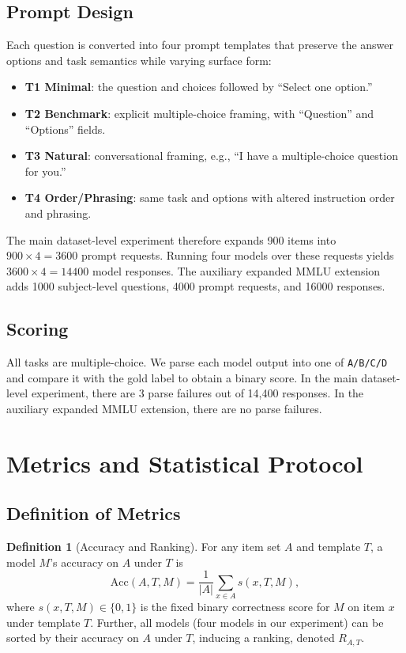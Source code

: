 \documentclass[11pt]{article}
\theoremstyle{definition}
\newtheorem{definition}{Definition}
\begin{document}
\subsection{Prompt Design}

Each question is converted into four prompt templates that preserve the answer options and task semantics while varying surface form:
\begin{itemize}[label={}]
    \item \textbf{T1 Minimal}: the question and choices followed by ``Select one option.''
    \item \textbf{T2 Benchmark}: explicit multiple-choice framing, with ``Question'' and ``Options'' fields.
    \item \textbf{T3 Natural}: conversational framing, e.g., ``I have a multiple-choice question for you.''
    \item \textbf{T4 Order/Phrasing}: same task and options with altered instruction order and phrasing.
\end{itemize}

The main dataset-level experiment therefore expands 900 items into $900 \times 4 = 3600$ prompt requests. Running four models over these requests yields $3600 \times 4 = 14400$ model responses. The auxiliary expanded MMLU extension adds 1000 subject-level questions, 4000 prompt requests, and 16000 responses.

\subsection{Scoring}

All tasks are multiple-choice. We parse each model output into one of \texttt{A/B/C/D} and compare it with the gold label to obtain a binary score. In the main dataset-level experiment, there are 3 parse failures out of 14,400 responses. In the auxiliary expanded MMLU extension, there are no parse failures.

\section{Metrics and Statistical Protocol}

\subsection{Definition of Metrics}

\begin{definition}[Accuracy and Ranking]
    For any item set $A$ and template $T$, a model $M$'s accuracy on $A$ under $T$ is
    \[
    \mathrm{Acc}(A,T,M) = \frac{1}{|A|}\sum_{x\in A} s(x,T,M),
    \]
    where $s(x,T,M)\in\{0,1\}$ is the fixed binary correctness score for $M$ on item $x$ under template $T$. Further, all models (four models in our experiment) can be sorted by their accuracy on $A$ under $T$, inducing a ranking, denoted $R_{A,T}$.
\end{definition}
\end{document}

